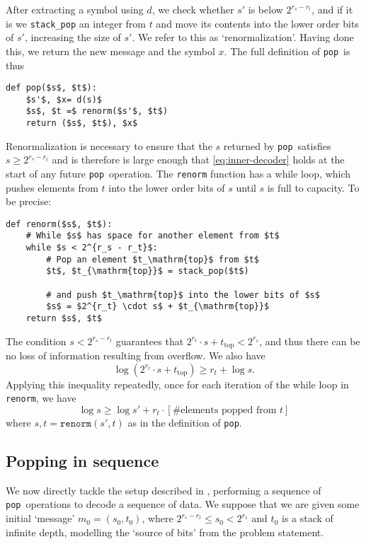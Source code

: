 \documentclass{article}
\theoremstyle{definition}
\newcommand{\pop}{\texttt{pop}}
\begin{document}
After extracting a symbol using \(d\), we check whether \(s'\) is below
\(2^{r_s - r_t}\), and if it is we \texttt{stack\_pop} an integer from \(t\)
and move its contents into the lower order bits of \(s'\), increasing the size
of \(s'\). We refer to this as `renormalization'. Having done this, we return
the new message and the symbol \(x\). The full definition of \pop\ is thus
\begin{lstlisting}
def pop($s$, $t$):
    $s'$, $x= d(s)$
    $s$, $t =$ renorm($s'$, $t$)
    return ($s$, $t$), $x$
\end{lstlisting}

Renormalization is necessary to ensure that the \(s\) returned by \pop\
satisfies \(s\geq2^{r_s - r_t}\) and is therefore is large enough that
\cref{eq:inner-decoder} holds at the start of any future \pop\ operation. The
\texttt{renorm} function has a while loop, which pushes elements from \(t\)
into the lower order bits of \(s\) until \(s\) is full to capacity. To be
precise:

\begin{lstlisting}
def renorm($s$, $t$):
    # While $s$ has space for another element from $t$
    while $s < 2^{r_s - r_t}$:
        # Pop an element $t_\mathrm{top}$ from $t$
        $t$, $t_{\mathrm{top}}$ = stack_pop($t$)

        # and push $t_\mathrm{top}$ into the lower bits of $s$
        $s$ = $2^{r_t} \cdot s$ + $t_{\mathrm{top}}$
    return $s$, $t$
\end{lstlisting}

The condition \(s < 2^{r_s - r_t}\) guarantees that \(2^{r_t} \cdot s +
t_{\text{top}} < 2^{r_s}\), and thus there can be no loss of information
resulting from overflow. We also have
\begin{equation}
  \log (2^{r_t} \cdot s + t_\text{top}) \geq r_t + \log s.
\end{equation}
Applying this inequality repeatedly, once for each iteration of the while loop
in \texttt{renorm}, we have
\begin{equation}\label{eq:renorm}
\log s \geq \log s' + r_t\cdot\left[\text{\# elements popped from \(t\)}\right]
\end{equation}
where \(s, t = \texttt{renorm}(s', t)\) as in the definition of \pop.

\subsection{Popping in sequence}
We now directly tackle the setup described in , performing a
sequence of \pop\ operations to decode a sequence of data. We suppose that we
are given some initial `message' \(m_0= (s_0, t_0)\), where \(2^{r_s - r_t}
\leq s_0 < 2^{r_s}\) and \(t_0\) is a stack of infinite depth, modelling the
`source of bits' from the problem statement.
\end{document}
